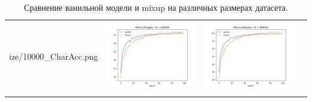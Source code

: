 \begin{longtable}{cccc}
ize/10000_CharAcc.png} & \includegraphics[scale=0.2]{./images/mixup_size/10000_FragAcc.png} & \includegraphics[scale=0.2]{./images/mixup_size/10000_WordAcc.png}\\
\caption{Сравнение ванильной модели и mixup на различных размерах датасета. }
\label{tab:mixup_size}
\end{longtable}

